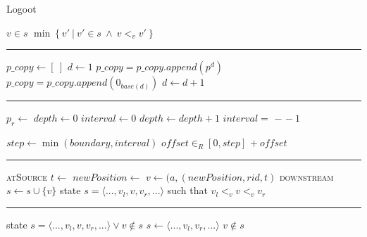 \documentclass[diss.tex]{subfiles}
\begin{document}
\begin{algorithm}[H]
\caption*{Logoot}
\begin{algorithmic}[1]
\Require $v \in s$
\State \Return $\min \left\{ v' ~|~ v' \in s ~\wedge~ v <_v v'  \right\}$
\EndFunction
\end{algorithmic}

\hrule

\begin{algorithmic}[1]
\State $p\_copy \gets [~]$
\State $d \gets 1$
$p\_copy = p\_copy.append(p^d)$
\Else
$p\_copy = p\_copy.append(0_{base(d)})$ 
\EndIf
\State $d \gets d+1$
\EndWhile
\EndFunction
\end{algorithmic}

\hrule

\begin{algorithmic}[1]
\State $p_r \gets $ 
\State $depth \gets 0$
\State $interval \gets 0$
\State $depth \gets depth + 1$
\State $interval = $  $ - $  $-~1$ 
\EndWhile

\State $step \gets \min(boundary, interval)$ 
\State $o\!f\!f\!set \in_R [0, step]$
\State \Return {} $ +~ o\!f\!f\!set$
\EndFunction
\end{algorithmic}

\hrule

\begin{algorithmic}[1]
\BState \textsc{atSource}
\State $t \gets $ 
\State $newPosition \gets $
\State $v \gets (a, (newPosition, rid, t)$
\BState \textsc{downstream}
\State $s \gets s \cup \{v\}$
\EndFunction
\Ensure state $s = \langle ..., v_l, v, v_r, ... \rangle$ such that $v_l <_v v <_v v_r$
\end{algorithmic}

\hrule

\begin{algorithmic}[1]

\Require state $s = \langle ..., v_l, v, v_r, ... \rangle \vee v \notin s$
\State $s \gets \langle ..., v_l, v_r, ... \rangle$
\EndIf
\EndFunction
\Ensure $v \notin s$
\end{algorithmic}
\end{algorithm}
\end{document}
